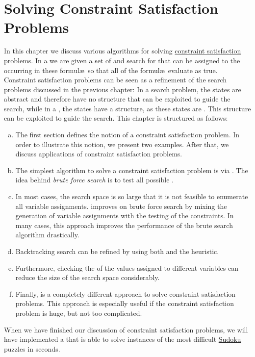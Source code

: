 \chapter{Solving Constraint Satisfaction Problems}
In this chapter we discuss various algorithms for solving 
\href{https://en.wikipedia.org/wiki/Constraint_satisfaction_problem}{constraint satisfaction problems}.
In a  we are given a set of  and search for 
that can be 
assigned to the  occurring in these formul\ae\  so that all of the formul\ae\  evaluate as true.
Constraint satisfaction problems can be seen as a refinement of the search problems discussed in the previous
chapter:  In a search problem, the states are abstract and therefore have no structure that can be exploited to
guide the search, while in a , the states have a structure, as these
states are .  This structure can be exploited to guide the search.  This chapter is
structured as follows: 
\begin{enumerate}[(a)]
\item The first section defines the notion of a constraint satisfaction problem.  In order to illustrate this
      notion, we present two examples.  After that, we discuss applications of constraint satisfaction problems.
\item The simplest algorithm to solve a constraint satisfaction problem is via .
      The idea behind \emph{brute force search} is to test all possible .
\item In most cases, the search space is so large that it is not feasible to enumerate all variable assignments.
       improves on brute force search by mixing the generation
      of variable assignments with the testing of the constraints.  In many cases, this approach
      improves the performance of the brute search algorithm drastically.
\item Backtracking search can be refined by using both  and 
      the  heuristic.
\item Furthermore, checking the  of the values assigned to different variables
      can reduce the size of the search space considerably. 
\item Finally,  is a completely different approach to solve
      constraint satisfaction problems.  This approach is especially useful if the constraint satisfaction
      problem is huge, but not too complicated.
\end{enumerate}
When we have finished our discussion of constraint satisfaction problems, we will have implemented a
 that is able to solve instances of the most difficult
\href{https://en.wikipedia.org/wiki/Sudoku}{Sudoku} puzzles in seconds.

